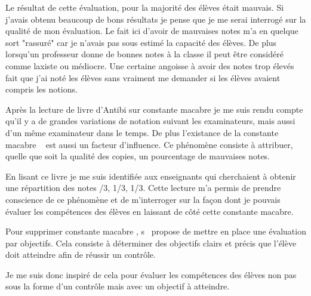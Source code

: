 Le résultat de cette évaluation, pour la majorité des élèves était mauvais.
Si j'avais obtenu beaucoup de bons résultats je pense que je me serai interrogé sur la qualité de mon évaluation.
Le fait ici d'avoir de mauvaises notes m'a en quelque sort "rassuré" car je n'avais pas sous estimé la capacité des élèves.
De plus lorsqu'un professeur donne de bonnes notes à la classe il peut être considéré comme laxiste ou médiocre.
Une certaine angoisse à avoir des notes trop élevés fait que j'ai noté les élèves sans vraiment me demander si les élèves avaient compris les notions.

Après la lecture de livre d'Antibi sur \og constante macabre \fg je me suis rendu compte qu'il y a de grandes variations de notation suivant les examinateurs, mais aussi d'un même examinateur dans le temps.
De plus l'existance de la \og constante macabre \fg~\cite{antibi2003constante} est aussi un facteur d'influence.
Ce phénomène consiste à attribuer, quelle que soit la qualité des copies, un pourcentage de mauvaises notes.

En lisant ce livre je me suis identifiée aux enseignants qui cherchaient à obtenir une répartition des notes /3, 1/3, 1/3\fg.
Cette lecture m'a permis de prendre conscience de ce phénomène et de m'interroger sur la façon dont je pouvais évaluer les compétences des élèves en laissant de côté cette constante macabre.

Pour supprimer \og constante macabre \fg, s~\cite{antibi2007notes} propose de mettre en place une évaluation par objectifs.
Cela consiste à déterminer des objectifs clairs et précis que l'élève doit atteindre afin de réussir un contrôle.

Je me suis donc inspiré de cela pour évaluer les compétences des élèves non pas sous la forme d'un contrôle mais avec un objectif à atteindre.

 